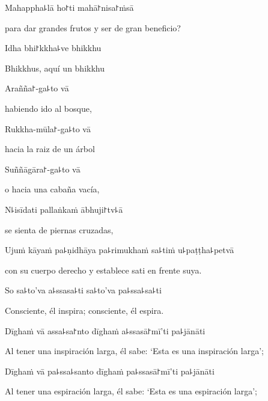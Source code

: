 Mahappha꜕lā ho꜓ti mahā꜓nisa꜓ṁsā

\begin{english}
  para dar grandes frutos y ser de gran beneficio?
\end{english}

Idha bhi꜓kkha꜕ve bhikkhu

\begin{english}
  Bhikkhus, aquí un bhikkhu
\end{english}

Arañña꜓-ga꜕to vā

\begin{english}
  habiendo ido al bosque,
\end{english}

Rukkha-mūla꜓-ga꜕to vā

\begin{english}
  hacia la raiz de un árbol
\end{english}

Suññāgāra꜓-ga꜕to vā

\begin{english}
  o hacia una cabaña vacía,
\end{english}

N꜕isīdati pallaṅkaṁ ābhuji꜓tv꜕ā

\begin{english}
  se sienta de piernas cruzadas,
\end{english}

Ujuṁ kāyaṁ pa꜕ṇidhāya pa꜕rimukhaṁ sa꜕tiṁ u꜕paṭṭha꜕petvā

\begin{english}
  con su cuerpo derecho y establece sati en frente suya.
\end{english}

So sa꜕to'va a꜕ssasa꜕ti sa꜕to'va pa꜕ssa꜕sa꜕ti

\begin{english}
  Consciente, él inspira; consciente, él espira.
\end{english}

Dīghaṁ vā assa꜕sa꜓nto dīghaṁ a꜕ssasā꜓mī'ti pa꜕jānāti

\begin{english}
  Al tener una inspiración larga, él sabe: ‘Esta es una inspiración larga’;
\end{english}

Dīghaṁ vā pa꜕ssa꜕santo dīghaṁ pa꜕ssasā꜓mī'ti pa꜕jānāti

\begin{english}
  Al tener una espiración larga, él sabe: ‘Esta es una espiración larga’;
\end{english}

